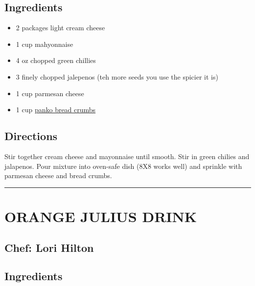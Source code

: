 \documentclass[
]{book}
\providecommand{\tightlist}{%
  \setlength{\itemsep}{0pt}\setlength{\parskip}{0pt}}
\begin{document}
\hypertarget{ingredients-8}{%
\subsection*{Ingredients}\label{ingredients-8}}

\begin{itemize}
\tightlist
\item
  2 packages light cream cheese
\item
  1 cup mahyonnaise
\item
  4 oz chopped green chillies
\item
  3 finely chopped jalepenos (teh more seeds you use the spicier it is)
\item
  1 cup parmesan cheese
\item
  1 cup \href{https://en.wikipedia.org/wiki/Bread_crumbs\#:~:text=Panko\%20(\%E3\%83\%91\%E3\%83\%B3\%E7\%B2\%89)\%20is\%20a\%20variety,create\%20fine\%20slivers\%20of\%20crumb}{panko bread crumbs}
\end{itemize}

\hypertarget{directions-8}{%
\subsection*{Directions}\label{directions-8}}

Stir together cream cheese and mayonnaise until smooth. Stir in green chilies and jalapenos. Pour mixture into oven-safe dish (8X8 works well) and sprinkle with parmesan cheese and bread crumbs.

\begin{center}\rule{0.5\linewidth}{0.5pt}\end{center}

\hypertarget{orange-julius-drink}{%
\section*{ORANGE JULIUS DRINK}\label{orange-julius-drink}}

\hypertarget{chef-lori-hilton}{%
\subsection*{Chef: Lori Hilton}\label{chef-lori-hilton}}

\hypertarget{ingredients-9}{%
\subsection*{Ingredients}\label{ingredients-9}}
\end{document}

